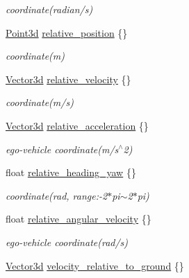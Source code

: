 \begin{DoxyCompactItemize}
\begin{DoxyCompactList}\small\item\em coordinate(radian/s) \end{DoxyCompactList}\item 
\hyperlink{structmaf__perception__interface_1_1Point3d}{Point3d} \hyperlink{structmaf__perception__interface_1_1PerceptionFusionObjectData_ae231ba0ee7663d4d09c076833773f944}{relative\+\_\+position} \{\}
\begin{DoxyCompactList}\small\item\em coordinate(m) \end{DoxyCompactList}\item 
\hyperlink{structmaf__perception__interface_1_1Vector3d}{Vector3d} \hyperlink{structmaf__perception__interface_1_1PerceptionFusionObjectData_ac670db450165d5dd16ea6caece3abbe1}{relative\+\_\+velocity} \{\}
\begin{DoxyCompactList}\small\item\em coordinate(m/s) \end{DoxyCompactList}\item 
\hyperlink{structmaf__perception__interface_1_1Vector3d}{Vector3d} \hyperlink{structmaf__perception__interface_1_1PerceptionFusionObjectData_a40c68870e0a630b45053062ce0d5905e}{relative\+\_\+acceleration} \{\}
\begin{DoxyCompactList}\small\item\em ego-\/vehicle coordinate(m/s$^\wedge$2) \end{DoxyCompactList}\item 
float \hyperlink{structmaf__perception__interface_1_1PerceptionFusionObjectData_a9426ce7f44091ab1c205d51889235381}{relative\+\_\+heading\+\_\+yaw} \{\}
\begin{DoxyCompactList}\small\item\em coordinate(rad, range\+:-\/2$\ast$pi$\sim$2$\ast$pi) \end{DoxyCompactList}\item 
float \hyperlink{structmaf__perception__interface_1_1PerceptionFusionObjectData_a948589a5038eb722b35fd217a8b789ad}{relative\+\_\+angular\+\_\+velocity} \{\}
\begin{DoxyCompactList}\small\item\em ego-\/vehicle coordinate(rad/s) \end{DoxyCompactList}\item 
\hyperlink{structmaf__perception__interface_1_1Vector3d}{Vector3d} \hyperlink{structmaf__perception__interface_1_1PerceptionFusionObjectData_a7a9928094aad4d8c61b022ba61ae0e4b}{velocity\+\_\+relative\+\_\+to\+\_\+ground} \{\}

\end{DoxyCompactItemize}
